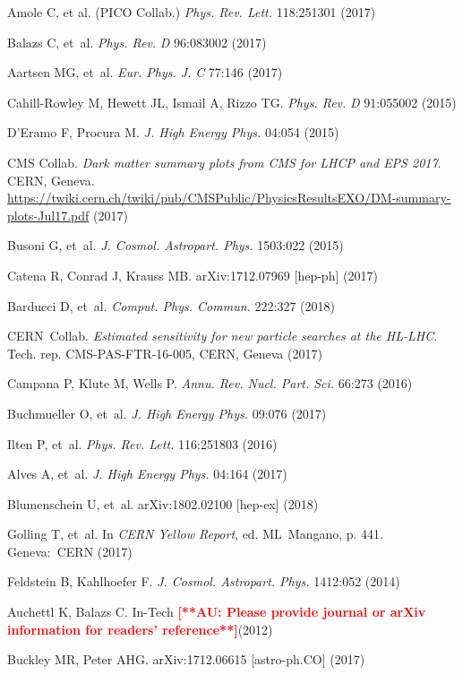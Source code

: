 \documentclass{ar-1col}
\begin{document}
\begin{thebibliography}{175}
Amole C, et al. (PICO Collab.) \textit{Phys. Rev. Lett.} 118:251301 (2017)

Balazs C, et~al. \textit{Phys. Rev.} \textit{D} 96:083002 (2017)

Aartsen MG, et~al. \textit{Eur. Phys. J.} \textit{C} 77:146 (2017)

Cahill-Rowley M, Hewett JL, Ismail A, Rizzo TG. \textit{Phys.
Rev.} \textit{D} 91:055002 (2015)

D'Eramo F, Procura M. \textit{J. High Energy Phys.} 04:054 (2015)

{CMS Collab}. {\textit{Dark \MakeLowercase{Matter Summary Plots} from CMS for LHCP and EPS 2017}}. CERN, Geneva. \url{https://twiki.cern.ch/twiki/pub/CMSPublic/PhysicsResultsEXO/DM-summary-plots-Jul17.pdf} (2017)

Busoni G, et~al. \textit{J. Cosmol. Astropart. Phys.} 1503:022 (2015)

Catena R, Conrad J, Krauss MB. arXiv:1712.07969 [hep-ph] (2017)

Barducci D, et~al. \textit{Comput. Phys. Commun.} 222:327 (2018)

{CERN\ Collab. \textit{Estimated sensitivity for new particle searches at the HL-LHC}}.
Tech. rep. CMS-PAS-FTR-16-005, CERN, Geneva (2017)

Campana P, Klute M, Wells P. \textit{Annu. Rev. Nucl. Part. Sci.}
66:273 (2016)

Buchmueller O, et~al. \textit{J. High Energy Phys.} 09:076 (2017)

Ilten P, et~al. \textit{Phys. Rev. Lett.} 116:251803 (2016)

Alves A, et~al. \textit{J. High Energy Phys.} 04:164 (2017)

Blumenschein U, et~al. arXiv:1802.02100 [hep-ex] (2018)

Golling T, et~al. In \textit{CERN Yellow Report}, ed. ML\ Mangano, p. 441. Geneva:\ CERN (2017)

Feldstein B, Kahlhoefer F. \textit{J. Cosmol. Astropart. Phys.} 1412:052 (2014)

Auchettl K, Balazs C. In-Tech \textbf{\textcolor{red}{[**AU: Please provide journal or arXiv information for readers' reference**]}}(2012)

Buckley MR, Peter AHG. arXiv:1712.06615 [astro-ph.CO] (2017)

\end{thebibliography}
\end{document}
